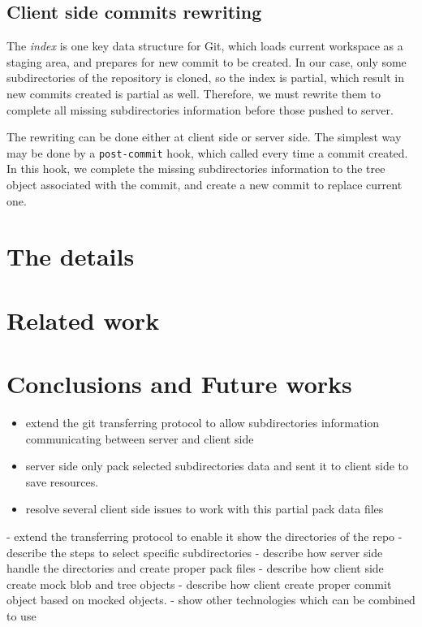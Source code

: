 \documentclass[preprint]{sigplanconf}
\begin{document}
\subsection{Client side commits rewriting}
The \emph{index} is one key data structure for Git, which loads current workspace as a staging area, and prepares for new commit to be created.
In our case, only some subdirectories of the repository is cloned, so the index is partial, which result in new commits created is partial as well.
Therefore, we must rewrite them to complete all missing subdirectories information before those pushed to server.

The rewriting can be done either at client side or server side.
The simplest way may be done by a \verb|post-commit| hook, which called every time a commit created.
In this hook, we complete the missing subdirectories information to the tree object associated with the commit, and create a new commit to replace current one.




\section{The details}


\section{Related work}

\section{Conclusions and Future works}


\begin{itemize}
  \item  extend the git transferring protocol to allow subdirectories information communicating between server and client side
  \item server side only pack selected subdirectories data and sent it to client side to save resources.
  \item resolve several client side issues to work with this partial pack data files
\end{itemize}

  - extend the transferring protocol to enable it show the directories of the repo
  - describe the steps to select specific subdirectories
  - describe how server side handle the directories and create proper pack files
  - describe how client side create mock blob and tree objects 
  - describe how client create proper commit object based on mocked objects.
- show other technologies which can be combined to use 
\end{document}
